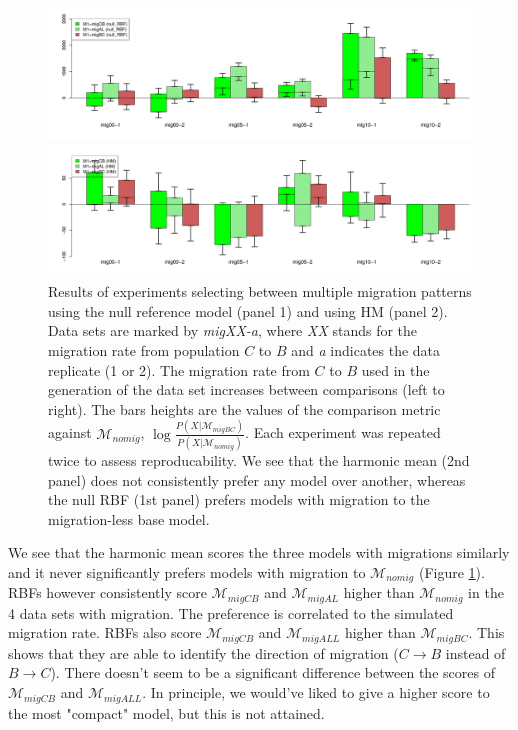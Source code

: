 \documentclass[11pt]{article}
\newcommand{\M}{\mathcal{M}}
\newcommand{\1}{\mathbbm{1}}
\begin{document}
\begin{figure}[H]


\includegraphics[width=1.0\textwidth]{results/results-migCB-select-1}

\includegraphics[width=1.0\textwidth]{results/results-migCB-select-2}
\captionsetup{width=0.8\textwidth}
\caption{
Results of experiments selecting between multiple migration patterns using the null reference model (panel 1) and using HM (panel 2).
%
Data sets are marked by \textit{migXX-a}, where \textit{XX} stands for the migration rate from population $C$ to $B$ and \textit{a} indicates the data replicate (1 or 2).
%
The migration rate from $C$ to $B$ used in the generation of the data set increases between comparisons (left to right).
%
The bars heights are the values of the comparison metric against $\M_{nomig}$, $\log{ \frac{P(X|\M_{migBC})}{P(X|\M_{nomig})}}$.
%
Each experiment was repeated twice to assess reproducability.
%
We see that the harmonic mean (2nd panel) does not consistently prefer any model over another, whereas the null RBF (1st panel) prefers models with migration to the migration-less base model. 
}
\label{fig:results-migCB-2}
\end{figure}




We see that the harmonic mean scores the three models with migrations similarly and it never significantly prefers models with migration to $\M_{nomig}$ (Figure \ref{fig:results-migCB-2}).
%
RBFs however consistently score $\M_{migCB}$ and $\M_{migAL}$ higher than $\M_{nomig}$ in the 4 data sets with migration. The preference is correlated to the simulated migration rate. 
%
RBFs also score $\M_{migCB}$ and $\M_{migALL}$ higher than $\M_{migBC}$. This shows that they are able to identify the direction of migration ($C\rightarrow B$ instead of $B \rightarrow C$).
%
There doesn't seem to be a significant difference between the scores of $\M_{migCB}$ and $\M_{migALL}$. In principle, we would've liked to give a higher score to the most "compact" model, but this is not attained.
\end{document}
